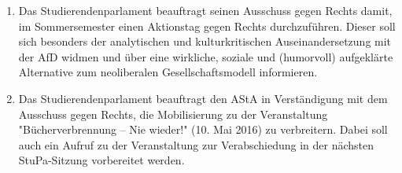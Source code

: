 \documentclass[ngerman,headheight=70pt]{scrartcl}
\begin{document}
    \begin{enumerate}
        \item Das Studierendenparlament beauftragt seinen Ausschuss gegen Rechts
        damit, im Sommersemester einen Aktionstag gegen Rechts durchzuführen.
        Dieser soll sich besonders der analytischen und kulturkritischen
        Auseinandersetzung mit der AfD widmen und über eine wirkliche, soziale und
        (humorvoll) aufgeklärte Alternative zum neoliberalen Gesellschaftsmodell
        informieren.
        \item Das Studierendenparlament beauftragt den AStA in Verständigung mit
        dem Ausschuss gegen Rechts, die Mobilisierung zu der Veranstaltung
        "Bücherverbrennung – Nie wieder!" (10. Mai 2016) zu verbreitern. Dabei
        soll auch ein Aufruf zu der Veranstaltung zur Verabschiedung in der
        nächsten StuPa-Sitzung vorbereitet werden.
    \end{enumerate}
\end{document}
